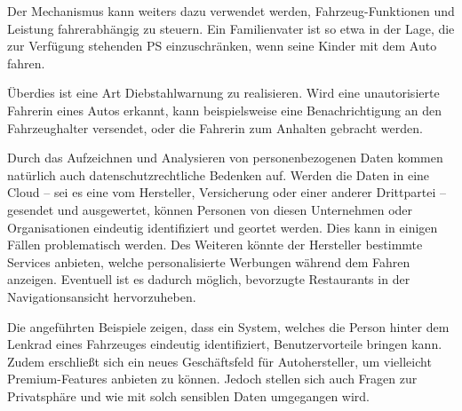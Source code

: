 Der Mechanismus kann weiters dazu verwendet werden, Fahrzeug-Funktionen und Leistung fahrerabhängig zu steuern. Ein Familienvater ist so etwa in der Lage, die zur Verfügung stehenden PS einzuschränken, wenn seine Kinder mit dem Auto fahren.

Überdies ist eine Art Diebstahlwarnung zu realisieren. Wird eine unautorisierte Fahrerin eines Autos erkannt, kann beispielsweise eine Benachrichtigung an den Fahrzeughalter versendet, oder die Fahrerin zum Anhalten gebracht werden.

Durch das Aufzeichnen und Analysieren von personenbezogenen Daten kommen natürlich auch datenschutzrechtliche Bedenken auf. Werden die Daten in eine Cloud – sei es eine vom Hersteller, Versicherung oder einer anderer Drittpartei – gesendet und ausgewertet, können Personen von diesen Unternehmen oder Organisationen eindeutig identifiziert und geortet werden. Dies kann in einigen Fällen problematisch werden. Des Weiteren könnte der Hersteller bestimmte Services anbieten, welche personalisierte Werbungen während dem Fahren anzeigen. Eventuell ist es dadurch möglich, bevorzugte Restaurants in der Navigationsansicht hervorzuheben.

Die angeführten Beispiele zeigen, dass ein System, welches die Person hinter dem Lenkrad eines Fahrzeuges eindeutig identifiziert, Benutzervorteile bringen kann. Zudem erschließt sich ein neues Geschäftsfeld für Autohersteller, um vielleicht Premium-Features anbieten zu können. Jedoch stellen sich auch Fragen zur Privatsphäre und wie mit solch sensiblen Daten umgegangen wird.
